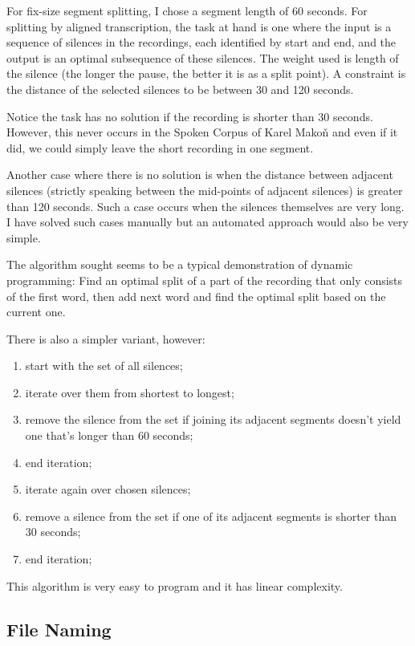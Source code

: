 \documentclass{llncs}
\begin{document}
For fix-size segment splitting, I chose a segment length of 60 seconds. For
splitting by aligned transcription, the task at hand is one where the input is a
sequence of silences in the recordings, each identified by start and end, and
the output is an optimal subsequence of these silences. The weight used is
length of the silence (the longer the pause, the better it is as a split point).
A constraint is the distance of the selected silences to be between 30 and 120
seconds.

Notice the task has no solution if the recording is shorter than 30 seconds.
However, this never occurs in the Spoken Corpus of Karel Makoň and even if it
did, we could simply leave the short recording in one segment.

Another case where there is no solution is when the distance between adjacent
silences (strictly speaking between the mid-points of adjacent silences) is
greater than 120 seconds. Such a case occurs when the silences themselves are
very long. I have solved such cases manually but an automated approach would
also be very simple.

The algorithm sought seems to be a typical demonstration of dynamic programming:
Find an optimal split of a part of the recording that only consists of the first
word, then add next word and find the optimal split based on the current one.

There is also a simpler variant, however:
\begin{enumerate}
\item{start with the set of all
silences;}
\item{iterate over them from shortest to longest;}
\item{remove the silence
from the set if joining its adjacent segments doesn't yield one that's longer
than 60 seconds;}
\item{end iteration;}
\item{iterate again over chosen silences;}
\item{remove a silence from the
set if one of its adjacent segments is shorter than 30 seconds;}
\item{end iteration;}
\end{enumerate}

This algorithm is very easy to program and it has linear complexity.

\subsection{File Naming}
\end{document}
